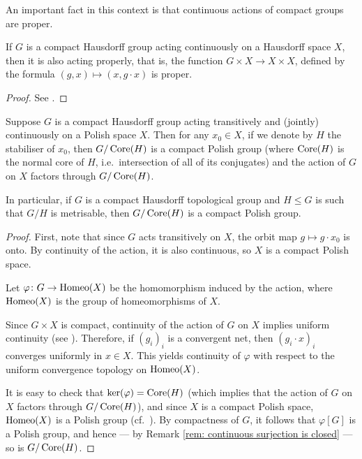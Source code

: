 	An important fact in this context is that continuous actions of compact groups are proper.
	\begin{fct}
		\label{fct:cpct_proper}
		If $G$ is a compact Hausdorff group acting continuously on a Hausdorff space $X$, then it is also acting properly, that is, the function $G\times X\to X\times X$, defined by the formula $(g,x)\mapsto (x,g\cdot x)$ is proper.
	\end{fct}
	\begin{proof}
		See \cite[Proposition 2 in \S4.1 of Chapter III]{NB66}.
	\end{proof}
	
	
	\begin{prop}
		\label{prop:cont_action_factors_through_Polish}
		Suppose $G$ is a compact Hausdorff group acting transitively and (jointly) continuously on a Polish space $X$. Then for any $x_0\in X$, if we denote by $H$ the stabiliser of $x_0$, then $G/\operatorname{{Core}}(H)$ is a compact Polish group (where $\operatorname{{Core}}(H)$ is the normal core of $H$, i.e.\ intersection of all of its conjugates) and the action of $G$ on $X$ factors through $G/\operatorname{{Core}}(H)$.
		
		In particular, if $G$ is a compact Hausdorff topological group and $H\leq G$ is such that $G/H$ is metrisable, then $G/\operatorname{{Core}}(H)$ is a compact Polish group.
	\end{prop}
	\begin{proof}
		First, note that since $G$ acts transitively on $X$, the orbit map $g\mapsto g\cdot x_0$ is onto. By continuity of the action, it is also continuous, so $X$ is a compact Polish space.
		
		Let $\varphi \colon G\to \operatorname{{Homeo}}(X)$ be the homomorphism induced by the action, where $\operatorname{{Homeo}}(X)$ is the group of homeomorphisms of $X$.
		
		Since $G\times X$ is compact, continuity of the action of $G$ on $X$ implies uniform continuity (see \cite[Theorem II in \S4.2 of Chapter II]{NB66}). Therefore, if $(g_i)_i$ is a convergent net, then $(g_i\cdot x)_i$ converges uniformly in $x \in X$. This yields continuity of $\varphi$ with respect to the uniform convergence topology on $\operatorname{{Homeo}}(X)$.
		
		It is easy to check that $\ker(\varphi)=\operatorname{{Core}}(H)$ (which implies that the action of $G$ on $X$ factors through $G/\operatorname{{Core}}(H)$), and since $X$ is a compact Polish space, $\operatorname{{Homeo}}(X)$ is a Polish group (cf.\ \cite[9.B(8)]{Kec95}). By compactness of $G$, it follows that $\varphi[G]$ is a Polish group, and hence --- by Remark \ref{rem: continuous surjection is closed} --- so is $G/\operatorname{{Core}}(H)$.
	\end{proof}
	
